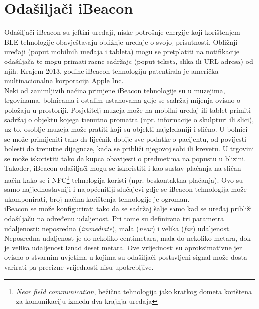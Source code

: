 \chapter{Odašiljači iBeacon}

Odašiljači iBeacon su jeftini uređaji, niske potrošnje energije koji korištenjem BLE tehnologije obavještavaju obližnje uređaje o svojoj prisutnosti. 
Obližnji uređaji (poput mobilnih uređaja i tableta) mogu se pretplatiti na notifikacije odašiljača te mogu primati razne sadržaje (poput teksta, slika ili URL adresa) od njih. 
Krajem 2013. godine iBeacon tehnologiju patentirala je američka multinacionalna korporacija Apple Inc.
\\

Neki od zanimljivih načina primjene iBeacon tehnologije su u muzejima, trgovinama, bolnicama i ostalim ustanovama gdje se sadržaj mijenja ovisno o položaju u prostoriji. 
Posjetitelj muzeja može na mobilni uređaj ili tablet primiti sadržaj o objektu kojega trenutno promatra (npr. informacije o skulpturi ili slici), uz to, osoblje muzeja može pratiti koji su objekti najgledaniji i slično. 
U bolnici se može primijeniti tako da liječnik dobije sve podatke o pacijentu, od povijesti bolesti do trenutne dijagnoze, kada se približi njegovoj sobi ili krevetu. 
U trgovini se može iskoristiti tako da kupca obavijesti o predmetima na popustu u blizini. 
Također, iBeacon odašiljači mogu se iskoristiti i kao sustav plaćanja na sličan način kako se i NFC\footnote{\textit{Near field communication}, bežična tehnologija jako kratkog dometa korištena za komunikaciju između dva krajnja uređaja} tehnologija koristi (npr. beskontaktna plaćanja).
Ovo su samo najjednostavniji i najopćenitiji slučajevi gdje se iBeacon tehnologija može ukomponirati, broj načina korištenja tehnologije je ogroman.
\\

iBeacon se može konfigurirati tako da se sadržaj šalje samo kad se uređaj približi odašiljaču na određenu udaljenost. 
Pri tome su definirana tri parametra udaljenosti: neposredna (\textit{immediate}), mala (\textit{near}) i velika (\textit{far}) udaljenost. 
Neposredna udaljenost je do nekoliko centimetara, mala do nekoliko metara, dok je velika udaljenost iznad deset metara. 
Ove vrijednosti su aproksimativne jer ovisno o stvarnim uvjetima u kojima su odašiljači postavljeni signal može dosta varirati pa precizne vrijednosti nisu upotrebljive.
\\

